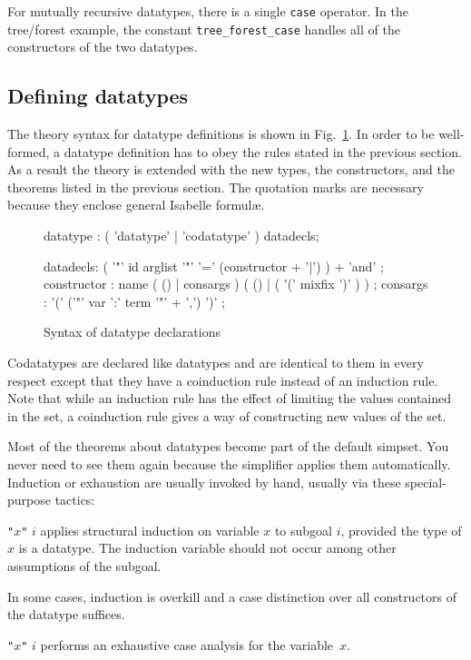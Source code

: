 For mutually recursive datatypes, there is a single \texttt{case} operator.
In the tree/forest example, the constant \texttt{tree_forest_case} handles all
of the constructors of the two datatypes.




\subsection{Defining datatypes}

The theory syntax for datatype definitions is shown in
Fig.~\ref{datatype-grammar}.  In order to be well-formed, a datatype
definition has to obey the rules stated in the previous section.  As a result
the theory is extended with the new types, the constructors, and the theorems
listed in the previous section.  The quotation marks are necessary because
they enclose general Isabelle formul\ae.

\begin{figure}
\begin{rail}
datatype : ( 'datatype' | 'codatatype' ) datadecls;

datadecls: ( '"' id arglist '"' '=' (constructor + '|') ) + 'and'
         ;
constructor : name ( () | consargs )  ( () | ( '(' mixfix ')' ) )
         ;
consargs : '(' ('"' var ':' term '"' + ',') ')'
         ;
\end{rail}
\caption{Syntax of datatype declarations}
\label{datatype-grammar}
\end{figure}

Codatatypes are declared like datatypes and are identical to them in every
respect except that they have a coinduction rule instead of an induction rule.
Note that while an induction rule has the effect of limiting the values
contained in the set, a coinduction rule gives a way of constructing new
values of the set.

Most of the theorems about datatypes become part of the default simpset.  You
never need to see them again because the simplifier applies them
automatically.  Induction or exhaustion are usually invoked by hand,
usually via these special-purpose tactics:
\begin{ttdescription}
\item[\ttindexbold{induct_tac} {\tt"}$x${\tt"} $i$] applies structural
  induction on variable $x$ to subgoal $i$, provided the type of $x$ is a
  datatype.  The induction variable should not occur among other assumptions
  of the subgoal.
\end{ttdescription}
In some cases, induction is overkill and a case distinction over all
constructors of the datatype suffices.
\begin{ttdescription}
\item[\ttindexbold{exhaust_tac} {\tt"}$x${\tt"} $i$]
 performs an exhaustive case analysis for the variable~$x$.
\end{ttdescription}

